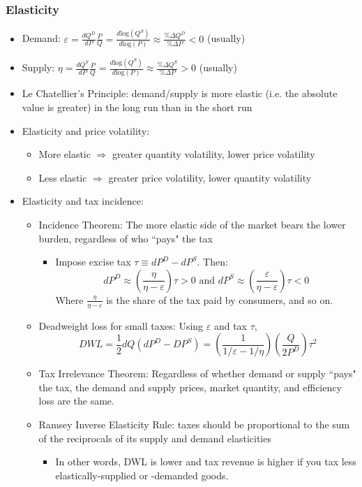 \documentclass{article}
\newcommand{\loge}[1]{\text{log}\left(#1\right)}
\newcommand{\blue}[1]{{\color{blue}#1}}
\begin{document}
\subsubsection{Elasticity}
\begin{itemize}
	\item Demand: $\varepsilon = \frac{dQ^D}{dP}\frac{P}{Q} = \frac{d\loge{Q^S}}{d\loge{P}}\approx \frac{\%\Delta Q^D}{\%\Delta  P} < 0$ (usually)
	\item Supply: $\eta = \frac{dQ^S}{dP}\frac{P}{Q} = \frac{d\loge{Q^S}}{d\loge{P}}\approx \frac{\%\Delta Q^S}{\%\Delta  P} > 0$ (usually)
	\item Le Chatellier's Principle: demand/supply is more elastic (i.e. the absolute value is greater) in the long run than in the short run
	\item Elasticity and price volatility:
		\begin{itemize}
			\item More elastic $\Rightarrow$ greater quantity volatility, lower price volatility
			\item Less elastic $\Rightarrow$ greater price volatility, lower quantity volatility
		\end{itemize}
	\item Elasticity and tax incidence:
		\begin{itemize}
			\item \blue{Incidence Theorem:} The more elastic side of the market bears the lower burden, regardless of who ``pays" the tax
			\begin{itemize}
				\item Impose excise tax $\tau\equiv dP^D-dP^S$. Then:
					\[
						dP^D\approx \left(\frac{\eta}{\eta-\varepsilon}\right)\tau>0\text{ and }dP^S\approx\left(\frac{\varepsilon}{\eta-\varepsilon}\right)\tau<0
					\]
					Where $\frac{\eta}{\eta-\varepsilon}$ is the share of the tax paid by consumers, and so on.
			\end{itemize}
			\item Deadweight loss for small taxes: Using $\varepsilon$ and tax $\tau$,
				\[
					DWL = \frac{1}{2}dQ(dP^D-DP^S)=\left(\frac{1}{1/\varepsilon-1/\eta}\right)\left(\frac{Q}{2P^D}\right)\tau^2
				\]
			\item \blue{Tax Irrelevance Theorem:} Regardless of whether demand or supply ``pays" the tax, the demand and supply prices, market quantity, and efficiency loss are the same.
			\item \blue{Ramsey Inverse Elasticity Rule:} taxes should be proportional to the sum of the reciprocals of its supply and demand elasticities
			\begin{itemize}
				\item In other words, DWL is lower and tax revenue is higher if you tax less elastically-supplied or -demanded goods.
			\end{itemize}
		\end{itemize}
	
\end{itemize}
\end{document}
